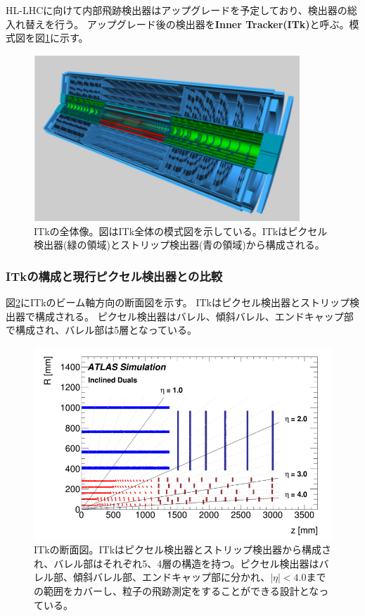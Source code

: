 HL-LHCに向けて内部飛跡検出器はアップグレードを予定しており、検出器の総入れ替えを行う。
アップグレード後の検出器を\textbf{Inner Tracker(ITk)}と呼ぶ。模式図を図\ref{itk_image}に示す。

\begin{figure}[bpt]\centering
\includegraphics[width=10cm]{./itk_image.png}
\caption[ITkの全体像]{ITkの全体像\cite{1-3}。図はITk全体の模式図を示している。ITkはピクセル検出器(緑の領域)とストリップ検出器(青の領域)から構成される。}
\label{itk_image}
\end{figure}

\subsubsection{ITkの構成と現行ピクセル検出器との比較}
図\ref{itk_cross_section}にITkのビーム軸方向の断面図を示す。
ITkはピクセル検出器とストリップ検出器で構成される。
ピクセル検出器はバレル、傾斜バレル、エンドキャップ部で構成され、バレル部は5層となっている。

\begin{figure}[bpt]\centering
\includegraphics[width=12cm]{./itk_cross_section.png}
\caption[ITkの断面図]{ITkの断面図\cite{1-3}。ITkはピクセル検出器とストリップ検出器から構成され、バレル部はそれぞれ5、4層の構造を持つ。ピクセル検出器はバレル部、傾斜バレル部、エンドキャップ部に分かれ、$|\eta|<4.0$までの範囲をカバーし、粒子の飛跡測定をすることができる設計となっている。}
\label{itk_cross_section}
\end{figure}

